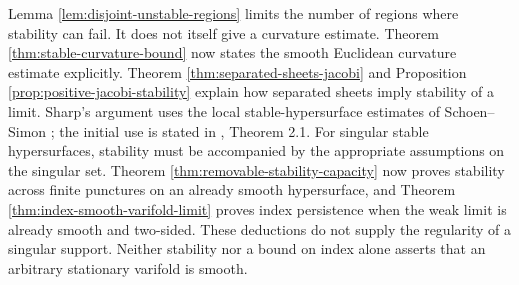\begin{remark}\label{rem:sharp-regularity-input}
Lemma \ref{lem:disjoint-unstable-regions} limits the number of regions where stability can fail. It does not itself give a curvature estimate. Theorem \ref{thm:stable-curvature-bound} now states the smooth Euclidean curvature estimate explicitly. Theorem \ref{thm:separated-sheets-jacobi} and Proposition \ref{prop:positive-jacobi-stability} explain how separated sheets imply stability of a limit. Sharp's argument uses the local stable-hypersurface estimates of Schoen--Simon \cite{SS81}; the initial use is stated in \cite{Sharp17}, Theorem 2.1. For singular stable hypersurfaces, stability must be accompanied by the appropriate assumptions on the singular set. Theorem \ref{thm:removable-stability-capacity} now proves stability across finite punctures on an already smooth hypersurface, and Theorem \ref{thm:index-smooth-varifold-limit} proves index persistence when the weak limit is already smooth and two-sided. These deductions do not supply the regularity of a singular support. Neither stability nor a bound on index alone asserts that an arbitrary stationary varifold is smooth.
\end{remark}
